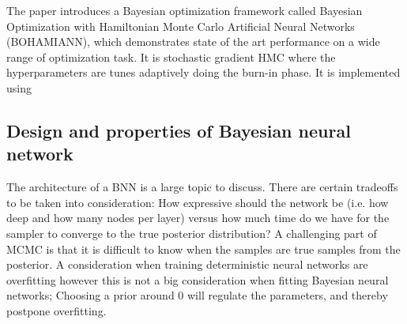 The paper \cite{BOHAMIANN} introduces a Bayesian optimization framework called Bayesian Optimization
with Hamiltonian Monte Carlo Artificial Neural Networks (BOHAMIANN), which demonstrates state of the art
performance on a wide range of optimization task. It is stochastic gradient HMC where the hyperparameters
are tunes adaptively doing the burn-in phase. It is implemented using 






\subsection{Design and properties of Bayesian neural network}
The architecture of a BNN is a large topic to discuss. There are certain tradeoffs to be taken into
consideration: How expressive should the network be (i.e. how deep and how many nodes per layer)
versus how much time do we have for the sampler to converge to the true posterior distribution? A
challenging part of MCMC is that it is difficult to know when the samples are true samples from the
posterior. A consideration when training deterministic neural networks are overfitting however this
is not a big consideration when fitting Bayesian neural networks; Choosing a prior around 0 will
regulate the parameters, and thereby postpone overfitting. 

